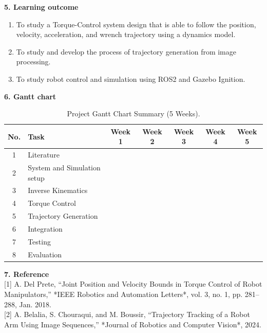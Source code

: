 \documentclass[10pt]{article}
\begin{document}
\newpage

\large
\noindent
\textbf{5. Learning outcome} \\
\normalsize
\begin{enumerate}[nosep, itemsep=-2pt]
    \item To study a Torque-Control system design that is able to follow the position, velocity, acceleration, and wrench trajectory using a dynamics model. 
    \item To study and develop the process of trajectory generation from image processing.
    \item To study robot control and simulation using ROS2 and Gazebo Ignition.
\end{enumerate}

\large
\noindent
\textbf{6. Gantt chart} \\
\normalsize
\renewcommand{\figurename}{Table} %
\begin{table}[h]
\centering
\begin{tabular}{|c|l|c|c|c|c|c|}
\hline
\textbf{No.} & \textbf{Task} & \textbf{Week 1} & \textbf{Week 2} & \textbf{Week 3} & \textbf{Week 4} & \textbf{Week 5} \\ \hline
1 & Literature & \cellcolor{ganttbar} &  &  &  &  \\ \hline
2 & System and Simulation setup & \cellcolor{ganttbar} &  &  &  &  \\ \hline
3 & Inverse Kinematics &  & \cellcolor{ganttbar} &  &  &  \\ \hline
4 & Torque Control &  & \cellcolor{ganttbar} & \cellcolor{ganttbar}  &  &  \\ \hline
5 & Trajectory Generation &  & \cellcolor{ganttbar} & \cellcolor{ganttbar}  &  &  \\ \hline
6 & Integration &  &  & \cellcolor{ganttbar} &  &  \\ \hline
7 & Testing &  &  &  & \cellcolor{ganttbar} &  \\ \hline
8 & Evaluation &  &  &  &  & \cellcolor{ganttbar} \\ \hline
\end{tabular}
\caption{Project Gantt Chart Summary (5 Weeks).}
\label{tab:gantt_excel}
\end{table}


\large
\noindent
\textbf{7. Reference} \\
\normalsize 
[1] A. Del Prete, “Joint Position and Velocity Bounds in Torque Control of Robot Manipulators,” *IEEE Robotics and Automation Letters*, vol. 3, no. 1, pp. 281–288, Jan. 2018. \\

[2] A. Belalia, S. Chouraqui, and M. Boussir, “Trajectory Tracking of a Robot Arm Using Image Sequences,” *Journal of Robotics and Computer Vision*, 2024. \\
\end{document}
